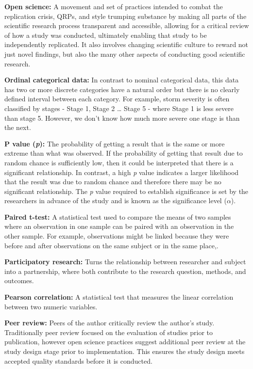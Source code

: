 \documentclass[
]{book}
\begin{document}
\textbf{Open science:} A movement and set of practices intended to combat the replication crisis, QRPs, and style trumping substance by making all parts of the scientific research process transparent and accessible, allowing for a critical review of how a study was conducted, ultimately enabling that study to be independently replicated. It also involves changing scientific culture to reward not just novel findings, but also the many other aspects of conducting good scientific research.

\textbf{Ordinal categorical data:} In contrast to nominal categorical data, this data has two or more discrete categories have a natural order but there is no clearly defined interval between each category. For example, storm severity is often classified by stages - Stage 1, Stage 2 \ldots{} Stage 5 - where Stage 1 is less severe than stage 5. However, we don't know how much more severe one stage is than the next.

\textbf{P value (\emph{p}):} The probability of getting a result that is the same or more extreme than what was observed. If the probability of getting that result due to random chance is sufficiently low, then it could be interpreted that there is a significant relationship. In contrast, a high \emph{p} value indicates a larger likelihood that the result was due to random chance and therefore there may be no significant relationship. The \emph{p} value required to establish significance is set by the researchers in advance of the study and is known as the significance level (\(\alpha\)).

\textbf{Paired t-test:} A statistical test used to compare the means of two samples where an observation in one sample can be paired with an observation in the other sample. For example, observations might be linked because they were before and after observations on the same subject or in the same place,.

\textbf{Participatory research:} Turns the relationship between researcher and subject into a partnership, where both contribute to the research question, methods, and outcomes.

\textbf{Pearson correlation:} A statistical test that measures the linear correlation between two numeric variables.

\textbf{Peer review:} Peers of the author critically review the author's study. Traditionally peer review focused on the evaluation of studies prior to publication, however open science practices suggest additional peer review at the study design stage prior to implementation. This ensures the study design meets accepted quality standards before it is conducted.
\end{document}
